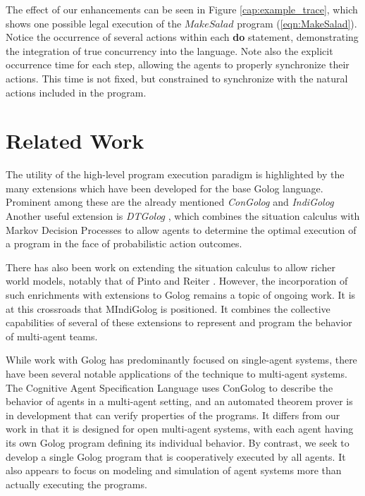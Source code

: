 \documentclass[letterpaper]{article}
\begin{document}
The effect of our enhancements can be seen in Figure
\ref{cap:example_trace}, which shows one possible legal execution of the
$MakeSalad$ program (\ref{eqn:MakeSalad}). Notice the occurrence of several
actions within each \textbf{do} statement, demonstrating the integration
of true concurrency into the language.
Note also the explicit occurrence time for
each step, allowing the agents to properly synchronize their actions.
This time is not fixed, but constrained to synchronize with the natural
actions included in the program.

\section{Related Work}

The utility of the high-level program execution paradigm is highlighted
by the many extensions which have been developed for the base Golog
language. Prominent among these are the already mentioned \emph{ConGolog}
\cite{giacomo00congolog} and 
\emph{IndiGolog} \cite{giacomo99indigolog}
Another useful extension is \emph{DTGolog} \cite{boutilier00dtgolog}, which
combines the situation calculus with Markov Decision Processes to
allow agents to determine the optimal execution of a program in the face
of probabilistic action outcomes.

There has also been work on extending the situation calculus to allow
richer world models, notably that of Pinto \cite{pinto94temporal}
and Reiter \cite{reiter96sc_nat_conc}. 
However, the incorporation of such enrichments with extensions to Golog
remains a topic of ongoing work.
It is at this crossroads
that MIndiGolog is positioned. It combines the
collective capabilities of several of these extensions to represent and program
the behavior of multi-agent teams.

While work with Golog has predominantly focused on single-agent systems,
there have been several notable applications of the technique to multi-agent
systems. The Cognitive Agent Specification Language \cite{shapiro02casl}
uses ConGolog to describe the behavior of agents in a multi-agent
setting, and an automated theorem prover is in development that can
verify properties of the programs. It differs from our work in that
it is designed for open multi-agent systems, with each agent having
its own Golog program defining its individual behavior. By contrast, we seek
to develop a single Golog program that is cooperatively executed by
all agents. It also appears to focus on modeling and simulation
of agent systems more than actually executing the programs.
\end{document}
